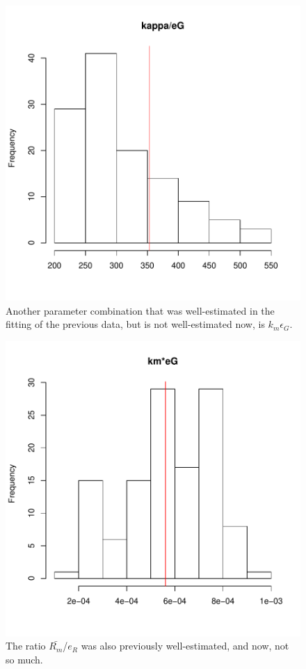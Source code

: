 \documentclass[12pt,reqno,final]{amsart}
\theoremstyle{plain}
\numberwithin{equation}{part}
\begin{document}
\begin{figure}
\includegraphics{Solving_the_problem_of_parameter_covariation_2-004}
\caption{Another parameter combination that was well-estimated in the fitting
of the previous data, but is not well-estimated now, is $k_m
\epsilon_G$.}
\end{figure}


\begin{figure}
\includegraphics{Solving_the_problem_of_parameter_covariation_2-005}
\caption{The ratio $\bar{R_m}$/$e_R$ was also previously well-estimated, and
now, not so much.}
\end{figure}
\end{document}
